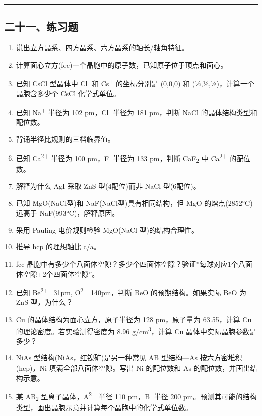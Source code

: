 \documentclass[a4paper,11pt]{ctexart}
\newcommand{\箭}{\ensuremath{\rightarrow}}
\newcommand{\左箭}{\ensuremath{\leftarrow}}
\newcommand{\上箭}{\ensuremath{\uparrow}}
\newcommand{\下箭}{\ensuremath{\downarrow}}
\newcommand{\衡}{\ensuremath{\rightleftharpoons}}
\newcommand{\双箭}{\ensuremath{\leftrightarrow}}
\newcommand{\约等于}{\ensuremath{\approx}}
\newcommand{\小于等于}{\ensuremath{\leq}}
\newcommand{\大于等于}{\ensuremath{\geq}}
\newcommand{\不等于}{\ensuremath{\neq}}
\newcommand{\西格马}{\ensuremath{\sigma}}
\newcommand{\派}{\ensuremath{\pi}}
\begin{document}
\begin{center}\rule{0.5\linewidth}{0.5pt}\end{center}

\subsection{二十一、练习题}\label{ux4e8cux5341ux4e00ux7ec3ux4e60ux9898}

\begin{enumerate}
\def\labelenumi{\arabic{enumi}.}
\item
  说出立方晶系、四方晶系、六方晶系的轴长/轴角特征。
\item
  计算面心立方(fcc)一个晶胞中的原子数，已知原子位于顶点和面心。
\item
  已知 CsCl 型晶体中 Cl\textsuperscript{-} 和 Cs\textsuperscript{+} 的坐标分别是 (0,0,0) 和 (½,½,½)，计算一个晶胞含多少个 CsCl 化学式单位。
\item
  已知 Na\textsuperscript{+} 半径为 102 pm，Cl\textsuperscript{-} 半径为 181 pm，判断 NaCl 的晶体结构类型和配位数。
\item
  背诵半径比规则的三档临界值。
\item
  已知 Ca\textsuperscript{2+} 半径为 100 pm，F\textsuperscript{-} 半径为 133 pm，判断 CaF\textsubscript{2} 中 Ca\textsuperscript{2+} 的配位数。
\item
  解释为什么 AgI 采取 ZnS 型(4配位)而非 NaCl 型(6配位)。
\item
  已知 MgO(NaCl型)和 NaF(NaCl型)具有相同结构，但 MgO 的熔点(2852°C)远高于 NaF(993°C)，解释原因。
\item
  采用 Pauling 电价规则检验 MgO(NaCl 型)的结构合理性。
\item
  推导 hcp 的理想轴比 c/a。
\item
  fcc 晶胞中有多少个八面体空隙？多少个四面体空隙？验证''每球对应1个八面体空隙+2个四面体空隙''。
\item
  已知 Be\textsuperscript{2+}=31pm, O\textsuperscript{2-}=140pm，判断 BeO 的预期结构。如果实际 BeO 为 ZnS 型，为什么？
\item
  Cu 的晶体结构为面心立方，原子半径为 128 pm，原子量为 63.55，计算 Cu 的理论密度。若实验测得密度为 8.96 g/cm\textsuperscript{3}，计算 Cu 晶体中实际晶胞参数是多少？
\item
  NiAs 型结构(NiAs，红镍矿)是另一种常见 AB 型结构---As 按六方密堆积(hcp)，Ni 填满全部八面体空隙。写出 Ni 的配位数和 As 的配位数，并画出结构示意。
\item
  某 AB\textsubscript{2} 型离子晶体，A\textsuperscript{2+} 半径 110 pm，B\textsuperscript{-} 半径 200 pm。预测其可能的结构类型，画出晶胞示意并计算每个晶胞中的化学式单位数。
\end{enumerate}
\end{document}
